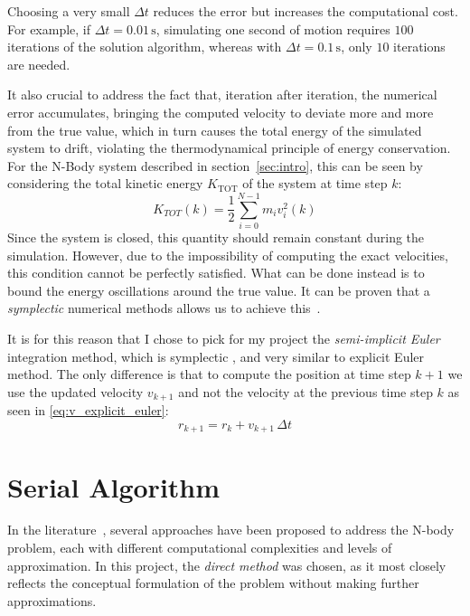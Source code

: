 \documentclass{article}
\begin{document}
Choosing a very small $\Delta t$ reduces the error but increases the computational cost.
For example, if $\Delta t = 0.01\,\text{s}$, simulating one second of motion requires $100$ iterations of the solution algorithm, whereas with $\Delta t = 0.1\,\text{s}$, only $10$ iterations are needed.

It also crucial to address the fact that, iteration after iteration, the numerical error accumulates, bringing the computed velocity to deviate more and more from the true value, which in turn causes the total energy of the simulated system to drift, violating the thermodynamical principle of energy conservation.
For the N-Body system described in section~\ref{sec:intro}, this can be seen by considering the total kinetic energy $K_{\text{TOT}}$ of the system at time step $k$:
\begin{equation}
K_{TOT}(k) = \frac{1}{2} \sum_{i=0}^{N-1}m_iv_i^2(k)
\end{equation}
Since the system is closed, this quantity should remain constant during the simulation. However, due to the impossibility of computing the exact velocities, this condition cannot be perfectly satisfied.
What can be done instead is to bound the energy oscillations around the true value.
It can be proven that a \emph{symplectic} numerical methods allows us to achieve this~\cite{ENGLE2005432}.

It is for this reason that I chose to pick for my project the \emph{semi-implicit Euler} integration method, which is symplectic \cite{cioaca2013impactexplicitsemiimplicitintegration}, and very similar to explicit Euler method. The only difference is that to compute the position at time step $k+1$ we use the updated velocity $v_{k+1}$ and not the velocity at the previous time step $k$ as seen in \ref{eq:v_explicit_euler}:
\begin{equation}
r_{k+1}=r_k+v_{k+1} \, \Delta t
\label{eq:v_semi_implicit}
\end{equation}

\section{Serial Algorithm}
In the literature~\cite{heggie2005classical}, several approaches have been proposed to address the N-body problem, each with different computational complexities and levels of approximation.  
In this project, the \emph{direct method} was chosen, as it most closely reflects the conceptual formulation of the problem without making further approximations.
\end{document}
